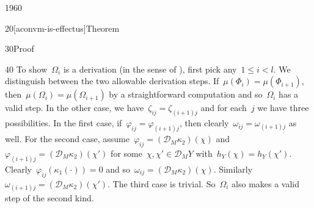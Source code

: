 \begin{parsec}{1960}
\begin{point}{20}[aconvm-is-effectus]{Theorem}
\begin{point}{30}{Proof}
\begin{point}{40}
To show~$\Omega_i$ is
    a derivation (in the sense of ),
    first pick any~$1 \leq i < l$.
We distinguish between the two allowable derivation steps.
If~$ \mu(\Phi_i) = \mu(\Phi_{i+1}) $,
    then~$\mu(\Omega_i) = \mu(\Omega_{i+1})$
    by a straightforward computation
    and so~$\Omega_i$ has a valid step.
In the other case, we have~$\zeta_{ij} = \zeta_{(i+1)j}$ and
    for each~$j$ we have three possibilities.
In the first case, if~$\varphi_{ij} = \varphi_{(i+1)j}$,
    then clearly~$\omega_{ij} = \omega_{(i+1)j}$ as well.
    For the second case, assume~$\varphi_{ij} = (\mathcal{D}_M \kappa_2) (\chi)$
    and~$\varphi_{(i+1)j} = (\mathcal{D}_M \kappa_2) (\chi')$
    for some~$\chi,\chi' \in \mathcal{D}_M Y$
    with~$h_Y(\chi) = h_Y(\chi')$.
    Clearly~$\varphi_{ij}(\kappa_1(\cdot)) = 0$
    and so~$\omega_{ij} = (\mathcal{D}_M \kappa_2)(\chi)$.
    Similarly~$\omega_{(i+1)j} = (\mathcal{D}_M \kappa_2)(\chi')$.
    The third case is trivial.
    So~$\Omega_i$ also makes a valid step of the second kind.


\end{point}
\end{point}
\end{point}
\end{parsec}
